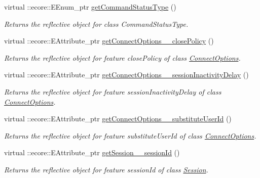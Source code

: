 \begin{DoxyCompactItemize}
virtual ::ecore::EEnum\_\-ptr \hyperlink{classUMS__Data_1_1UMS__DataPackage_a0138aea1e3da8269ef2715f38e9fe94f}{getCommandStatusType} ()
\begin{DoxyCompactList}\small\item\em Returns the reflective object for class CommandStatusType. \item\end{DoxyCompactList}\item 
virtual ::ecore::EAttribute\_\-ptr \hyperlink{classUMS__Data_1_1UMS__DataPackage_a4e2e5d6397876ed213a5dcfce329d8be}{getConnectOptions\_\-\_\-closePolicy} ()
\begin{DoxyCompactList}\small\item\em Returns the reflective object for feature closePolicy of class \hyperlink{classUMS__Data_1_1ConnectOptions}{ConnectOptions}. \item\end{DoxyCompactList}\item 
virtual ::ecore::EAttribute\_\-ptr \hyperlink{classUMS__Data_1_1UMS__DataPackage_aeb9fd84dd09ae58c0a25b28de2d834f5}{getConnectOptions\_\-\_\-sessionInactivityDelay} ()
\begin{DoxyCompactList}\small\item\em Returns the reflective object for feature sessionInactivityDelay of class \hyperlink{classUMS__Data_1_1ConnectOptions}{ConnectOptions}. \item\end{DoxyCompactList}\item 
virtual ::ecore::EAttribute\_\-ptr \hyperlink{classUMS__Data_1_1UMS__DataPackage_ae6f540e94877f608373c29e592842455}{getConnectOptions\_\-\_\-substituteUserId} ()
\begin{DoxyCompactList}\small\item\em Returns the reflective object for feature substituteUserId of class \hyperlink{classUMS__Data_1_1ConnectOptions}{ConnectOptions}. \item\end{DoxyCompactList}\item 
virtual ::ecore::EAttribute\_\-ptr \hyperlink{classUMS__Data_1_1UMS__DataPackage_a1241df5f8d295e65c1e5e848cb0016b6}{getSession\_\-\_\-sessionId} ()
\begin{DoxyCompactList}\small\item\em Returns the reflective object for feature sessionId of class \hyperlink{classUMS__Data_1_1Session}{Session}. \item\end{DoxyCompactList}\item 

\end{DoxyCompactItemize}
